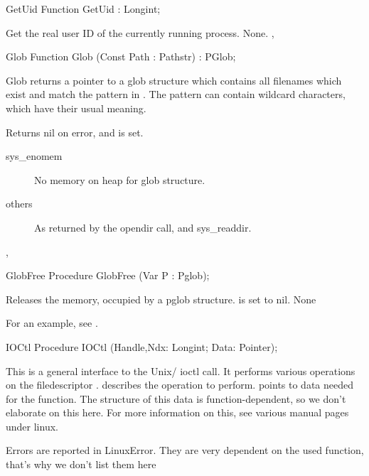 \html{}
\begin{function}{GetUid}
\Declaration
Function GetUid  : Longint;

\Description
 Get the real user ID of the currently running process.
\Errors
None.
\SeeAlso
{},  
\end{function}
\html{}
\begin{function}{Glob}
\Declaration
Function Glob (Const Path : Pathstr) : PGlob;

\Description

Glob returns a pointer to a glob structure which contains all filenames which
exist and match the pattern in .
The pattern can contain wildcard characters, which have their
usual meaning.

\Errors
 Returns nil on error, and  is set.
\begin{description}
\item[sys\_enomem] No memory on heap for glob structure.
\item[others] As returned by the opendir call, and sys\_readdir.
\end{description}

\SeeAlso
{},  
\end{function}
\html{}
\begin{procedure}{GlobFree}
\Declaration
Procedure GlobFree (Var P : Pglob);

\Description
Releases the memory, occupied by a pglob structure.  is set to nil.
\Errors
None
\SeeAlso
\end{procedure}
For an example, see .
\begin{procedure}{IOCtl}
\Declaration
Procedure IOCtl (Handle,Ndx: Longint; Data: Pointer);

\Description

This is a general interface to the Unix/ \linux ioctl call.
It performs various operations on the filedescriptor .
 describes the operation to perform.
 points to data needed for the  function. 
The structure of this data is function-dependent, so we don't elaborate on
this here. 
For more information on this, see various manual pages under linux.

\Errors

Errors are reported in LinuxError. They are very dependent on the used
function, that's why we don't list them here

\SeeAlso
{}
\end{procedure}
